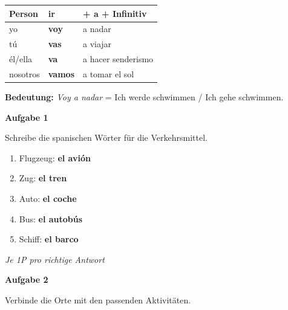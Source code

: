 \documentclass[11pt, a4paper]{article}
\newcommand{\fachfarbe}{spanisch}
\newcommand{\punktebox}[1]{\hfill\fbox{\small \_/#1}}
\newcommand{\loesung}[1]{\textcolor{loesung}{\textbf{#1}}}
\newenvironment{aufgabe}[1]{%
    \vspace{10pt}
    \noindent\textbf{\textcolor{\fachfarbe}{Aufgabe #1}}
    \vspace{5pt}
    \begin{list}{}{\leftmargin=0pt}
    \item[]
}{%
    \end{list}
}
\begin{document}
\begin{merkkasten}

\begin{center}
\begin{tabular}{|l|l|l|}
\hline
\textbf{Person} & \textbf{ir} & \textbf{+ a + Infinitiv} \\
\hline
yo & \loesung{voy} & a nadar \\
\hline
tú & \loesung{vas} & a viajar \\
\hline
él/ella & \loesung{va} & a hacer senderismo \\
\hline
nosotros & \loesung{vamos} & a tomar el sol \\
\hline
\end{tabular}
\end{center}

\vspace{0.5em}
\textbf{Bedeutung:} \textit{Voy a nadar} = Ich werde schwimmen / Ich gehe schwimmen.
\end{merkkasten}

\vspace{15pt}


\begin{aufgabe}{1}
Schreibe die spanischen Wörter für die Verkehrsmittel. \punktebox{5}
\end{aufgabe}

\begin{enumerate}[label=\alph*)]
    \item Flugzeug: \loesung{el avión}
    \item Zug: \loesung{el tren}
    \item Auto: \loesung{el coche}
    \item Bus: \loesung{el autobús}
    \item Schiff: \loesung{el barco}
\end{enumerate}

\textit{\textcolor{grau}{Je 1P pro richtige Antwort}}

\vspace{15pt}


\begin{aufgabe}{2}
Verbinde die Orte mit den passenden Aktivitäten. \punktebox{4}
\end{aufgabe}
\end{document}
